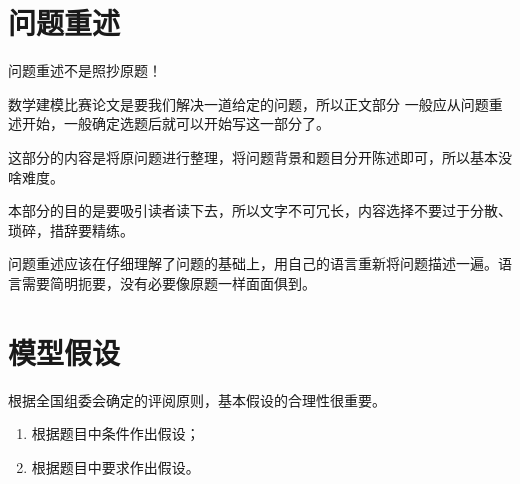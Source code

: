 \documentclass{suesmmthesis}
\begin{document}
    \makecover
    \begin{abstract}
        请至少使用 \TeX Live 2019，XeLaTeX 编译，请选用支持 UTF­-8 编码的编辑器。

		使用者需要有一定的 \LaTeX{} 的使用经验，因此本文没有介绍基础使用，至少要会使用常用宏包的一些功能，比如参考文献，数学公式，图片使用，列表环境等等。模板已经添加了常用的宏包，无需用户再额外添加。

		本模板
		\begin{itemize}
			\item 本模板参考上海工程技术大学数学建模竞赛论文Word模板修改，方便学校同学使用；
			\item 图片应放在 \lstinline|figure| 文件夹中；
			\item 加载了 \lstinline|cleveref| 宏包，使用方法：\lstinline|\cref{label}|。
		\end{itemize}
	
		欢迎下载使用本模板，本模板代码地址为\href{https://github.com/MobtgZhang/sues-mm}{Github地址}，并且此代码已经部署到\href{https://www.overleaf.com/read/mynpkfvwqjnm}{Overleaf}上，可以提供给大家正常使用。同时也欢迎大家到我的GitHub上提交issue，以方便模板的更新。
    \end{abstract}
    \tableofcontents
    \newpage
    \section{问题重述}
    问题重述不是照抄原题！

    数学建模比赛论文是要我们解决一道给定的问题，所以正文部分 一般应从问题重述开始，一般确定选题后就可以开始写这一部分了。

    这部分的内容是将原问题进行整理，将问题背景和题目分开陈述即可，所以基本没啥难度。

    本部分的目的是要吸引读者读下去，所以文字不可冗长，内容选择不要过于分散、琐碎，措辞要精练。

    问题重述应该在仔细理解了问题的基础上，用自己的语言重新将问题描述一遍。语言需要简明扼要，没有必要像原题一样面面俱到。
    \section{模型假设}
    根据全国组委会确定的评阅原则，基本假设的合理性很重要。

    \begin{enumerate}[label=（\arabic*）]
        \item 根据题目中条件作出假设；
        \item 根据题目中要求作出假设。
    \end{enumerate}
    
\end{document}
